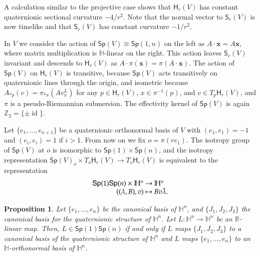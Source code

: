 \documentclass[12pt, a4paper,draft]{amsart}
\newcommand{\id}{\operatorname{id}}
\newcommand{\R}{\mathbb{R}}
\renewcommand{\H}{\mathbb{H}}
\newcommand{\Sp}{\mathsf{Sp}}
\newtheorem{proposition}[theorem]{Proposition}
\theoremstyle{remark}
\begin{document}
A calculation similar to the projective case shows that $\mathsf{H}_r(V)$ has constant quaternionic sectional curvature $-4/r^2$. 
Note that the normal vector to $\mathsf{S}_r(V)$ is now timelike and that $\mathsf{S}_r(V)$ has constant curvature $-1/r^2$.
\medskip

In $V$ we consider the action of $\Sp(V)\cong\Sp(1,n)$ on the left as
$A\cdot\mathbf{x}=A\mathbf{x}$, where matrix multiplication is $\H$-linear on the right.
This action leaves $\mathsf{S}_r(V)$ invariant and descends to $\mathsf{H}_r(V)$ as $A\cdot\pi(\mathbf{x})=\pi(A\cdot\mathbf{x})$.
The action of $\Sp(V)$ on $\mathsf{H}_r(V)$ is transitive, because $\Sp(V)$ acts transitively on quaternionic lines through the origin, and isometric because
$A_{*p}(v)=\pi_{*x}(Av_x^L)$ for any $p\in\mathsf{H}_r(V)$, $x\in\pi^{-1}(p)$, and $v\in T_p\mathsf{H}_r(V)$, and $\pi$ is a pseudo-Riemannian submersion.
The effectivity kernel of $\Sp(V)$ is again $\mathbb{Z}_2=\{\pm \id\}$.

Let $\{e_1,\dots,e_{n+1}\}$ be a quaternionic orthonormal basis of $V$ with $(e_1,e_1)=-1$ and $(e_i,e_i)=1$ if $i>1$.
From now on we fix $o=\pi(re_1)$.
The isotropy group of $\Sp(V)$ at $o$ is isomorphic to $\Sp(1)\times\Sp(n)$, 
and the isotropy representation $\Sp(V)_o\times T_o\mathsf{H}_r(V)\to T_o\mathsf{H}_r(V)$
is equivalent to the representation
\[
\begin{array}{r@{\ }c@{\ }l}
\Sp(1)\Sp(n)\times\H^n & \to & \H^n\\
((\lambda,B),v) & \mapsto & Bv\bar{\lambda}.
\end{array}
\]

\begin{proposition}
Let $\{e_1,\dots,e_n\}$ be the canonical basis of $\H^n$, and $\{J_1,J_2,J_3\}$ the canonical basis for the quaternionic structure of $\H^n$.
Let $L\colon\H^n\to\H^n$ be an $\R$-linear map.
Then, $L\in\Sp(1)\Sp(n)$ if and only if $L$ maps $\{J_1,J_2,J_3\}$ to a canonical basis of the quaternionic structure of $\H^n$ and $L$ maps $\{e_1,\dots,e_n\}$ to an $\H$-orthonormal basis of $\H^n$.
\end{proposition}
\end{document}
